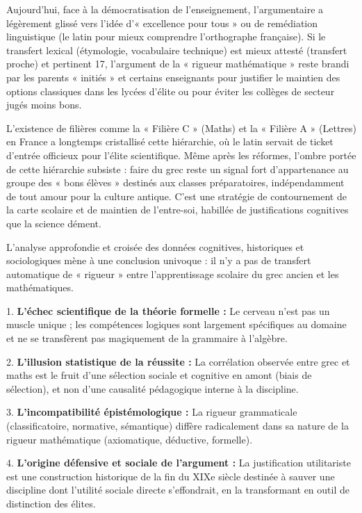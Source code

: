 Aujourd'hui, face à la démocratisation de l'enseignement, l'argumentaire a légèrement glissé vers
l'idée d'« excellence pour tous » ou de remédiation linguistique (le latin pour mieux comprendre
l'orthographe française). Si le transfert lexical (étymologie, vocabulaire technique) est mieux
attesté (transfert proche) et pertinent 17, l'argument de la « rigueur mathématique » reste brandi
par les parents « initiés » et certains enseignants pour justifier le maintien des options
classiques dans les lycées d'élite ou pour éviter les collèges de secteur jugés moins
bons.\cite{II-1-2-ref65}

L'existence de filières comme la « Filière C » (Maths) et la « Filière A » (Lettres) en France a
longtemps cristallisé cette hiérarchie, où le latin servait de ticket d'entrée officieux pour
l'élite scientifique.\cite{II-1-2-ref66} Même après les réformes, l'ombre portée de cette hiérarchie
subsiste : faire du grec reste un signal fort d'appartenance au groupe des « bons élèves » destinés
aux classes préparatoires, indépendamment de tout amour pour la culture antique. C'est une stratégie
de contournement de la carte scolaire et de maintien de l'entre-soi, habillée de justifications
cognitives que la science dément.

L'analyse approfondie et croisée des données cognitives, historiques et sociologiques mène à une
conclusion univoque : il n'y a pas de transfert automatique de « rigueur » entre l'apprentissage
scolaire du grec ancien et les mathématiques.

1. \textbf{L'échec scientifique de la théorie formelle :} Le cerveau n'est pas un muscle unique ;
les compétences logiques sont largement spécifiques au domaine et ne se transfèrent pas magiquement
de la grammaire à l'algèbre.

2. \textbf{L'illusion statistique de la réussite :} La corrélation observée entre grec et maths est
le fruit d'une sélection sociale et cognitive en amont (biais de sélection), et non d'une causalité
pédagogique interne à la discipline.

3. \textbf{L'incompatibilité épistémologique :} La rigueur grammaticale (classificatoire, normative,
sémantique) diffère radicalement dans sa nature de la rigueur mathématique (axiomatique, déductive,
formelle).

4. \textbf{L'origine défensive et sociale de l'argument :} La justification utilitariste est une
construction historique de la fin du XIXe siècle destinée à sauver une discipline dont l'utilité
sociale directe s'effondrait, en la transformant en outil de distinction des élites.

